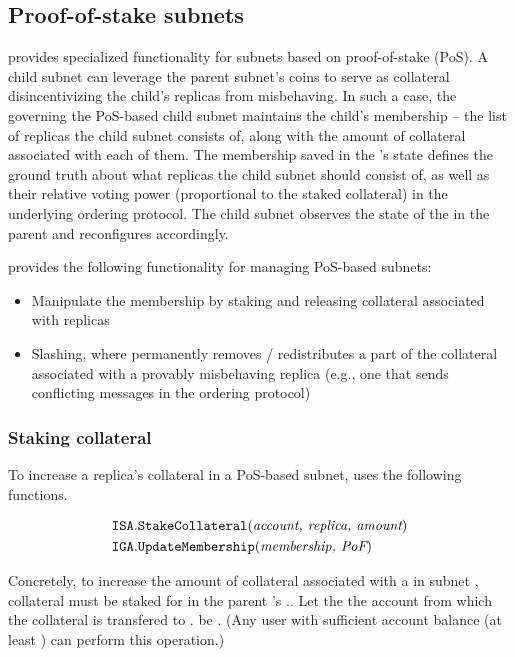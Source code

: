 \subsection{Proof-of-stake subnets}

\ipc provides specialized functionality for subnets based on proof-of-stake (PoS).
A child subnet can leverage the parent subnet's coins to serve as collateral disincentivizing the child's replicas from misbehaving.
In such a case, the \sa governing the PoS-based child subnet maintains the child's membership
-- the list of replicas the child subnet consists of, along with the amount of collateral associated with each of them.
The membership saved in the \sa's state defines the ground truth about what replicas the child subnet should consist of,
as well as their relative voting power (proportional to the staked collateral) in the underlying ordering protocol.
The child subnet observes the state of the \sa in the parent and reconfigures accordingly.

\ipc provides the following functionality for managing PoS-based subnets:
\begin{itemize}
    \item Manipulate the membership by staking and releasing collateral associated with replicas
    \item Slashing, where \ipc permanently removes / redistributes a part of the collateral associated with a provably misbehaving replica (e.g., one that sends conflicting messages in the ordering protocol)
\end{itemize}


\subsubsection{Staking collateral}
\label{sec:staking-collateral}

To increase a replica's collateral in a PoS-based subnet, \ipc uses the following functions.

\begin{align*}
    \texttt{ISA}.&\texttt{StakeCollateral}(\textit{account, replica, amount})\\
    \texttt{IGA}.&\texttt{UpdateMembership}(\textit{membership, \textit{PoF}})
\end{align*}

Concretely, to increase the amount of collateral associated with a  in subnet ,
collateral must be staked for  in the parent 's \saFull {}..
Let the the account from which the collateral is transfered to . be .
(Any user with sufficient account balance (at least ) can perform this operation.)

